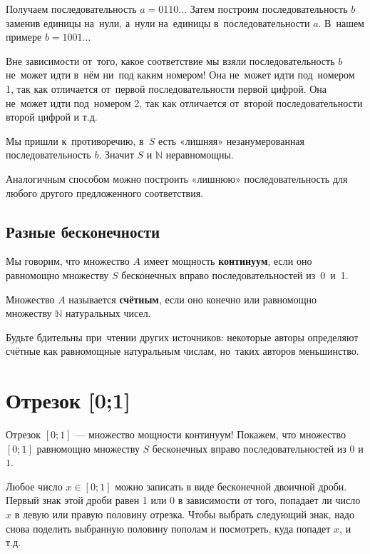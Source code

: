 \documentclass[12pt, a4paper]{article}
\begin{document}
Получаем последовательность $a=0110\ldots$ Затем построим последовательность $b$ заменив единицы на~нули, а~нули на~единицы в~последовательности $a$. В~нашем примере $b=1001\ldots $

Вне зависимости от~того, какое соответствие мы взяли  последовательность $b$ не~может идти в~нём ни~под каким номером! Она не~может идти под~номером 1, так как отличается от~первой последовательности первой цифрой. Она не~может идти под~номером 2, так как отличается от~второй последовательности второй цифрой и т.д.

Мы пришли к~противоречию, в~$S$ есть «лишняя» незанумерованная последовательность $b$. Значит $S$ и $\mathbb{N}$ неравномощны.

Аналогичным способом можно построить «лишнюю» последовательность для любого другого предложенного соответствия.

\subsection{Разные бесконечности}

Мы говорим, что множество $A$ имеет мощность \textbf{континуум}, если оно равномощно множеству $S$ бесконечных вправо последовательностей из~0~и~1.


Множество $A$ называется \textbf{счётным}, если оно конечно или равномощно множеству $\mathbb{N}$ натуральных чисел.

Будьте бдительны при~чтении других источников: некоторые авторы определяют счётные как равномощные натуральным числам, но~таких авторов меньшинство.

\section{Отрезок [0;1]}

Отрезок $[0;1]$ --- множество мощности континуум!
Покажем, что множество $[0;1]$ равномощно множеству $S$ бесконечных вправо последовательностей из $0$ и $1$.

Любое число $x \in [0;1]$ можно записать в виде бесконечной двоичной дроби. Первый знак этой дроби равен 1 или 0 в зависимости от того, попадает ли число $x$ в левую или правую половину отрезка. Чтобы выбрать следующий знак, надо снова поделить выбранную половину пополам и посмотреть, куда попадет $x$, и т.д.
\end{document}
